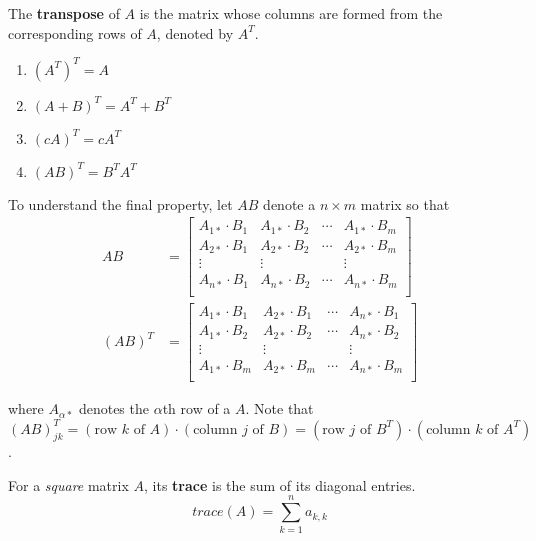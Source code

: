 \begin{definition}
The \textbf{transpose} of $A$ is the matrix whose columns are formed from the corresponding rows of $A$, denoted by $A^T$. 
\begin{enumerate}
	\item $(A^T)^T = A$
	\item $(A + B)^T = A^T + B^T$
	\item $(cA)^T = cA^T$
	\item $(AB)^T = B^T A^T$
\end{enumerate}

To understand the final property, let $AB$ denote a $n \times m$ matrix so that 
$$
\begin{aligned}
AB &= \begin{bmatrix}
A_{1*} \cdot B_{1} & A_{1*} \cdot B_{2} & \cdots & A_{1*} \cdot B_{m} \\
A_{2*} \cdot B_{1} & A_{2*} \cdot B_{2} & \cdots & A_{2*} \cdot B_{m} \\
\vdots & \vdots &  & \vdots \\
A_{n*} \cdot B_{1} & A_{n*} \cdot B_{2} & \cdots & A_{n*} \cdot B_{m} \\
\end{bmatrix} \\
(AB)^{T} &= \begin{bmatrix}
A_{1*} \cdot B_{1} & A_{2*} \cdot B_{1} & \cdots & A_{n*} \cdot B_{1} \\
A_{1*} \cdot B_{2} & A_{2*} \cdot B_{2} & \cdots & A_{n*} \cdot B_{2} \\
\vdots & \vdots &  & \vdots \\
A_{1*} \cdot B_{m} & A_{2*} \cdot B_{m} & \cdots & A_{n*} \cdot B_{m} \\

\end{bmatrix}
\end{aligned}
$$

where $A_{\alpha *}$ denotes the $\alpha$th row of a $A$. Note that $(AB)^{T}_{jk} = (\text{row $k$ of $A$}) \cdot (\text{column $j$ of $B$}) = (\text{row $j$ of $B^{T}$}) \cdot (\text{column $k$ of $A^{T}$}) $. 

\end{definition}

\begin{definition}
For a \textit{square} matrix $A$, its \textbf{trace} is the sum of its diagonal entries. 
$$trace(A) = \sum_{k=1}^{n} a_{k, k}$$
\end{definition}

